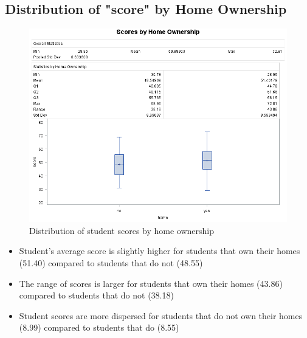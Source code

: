 \documentclass[12pt]{article}
\begin{document}
\subsection{Distribution of "score" by Home Ownership}
\begin{figure}[h]
    \centering
    \includegraphics[width=1.14\textwidth]{images/scores_by_home.png}
    \caption{Distribution of student scores by home ownership}
    \label{scores_by_home}
\end{figure}

\begin{itemize}
    \item Student's average score is slightly higher for students that own their homes (51.40) compared to students that do not (48.55)
    \item The range of scores is larger for students that own their homes (43.86) compared to students that do not (38.18)
    \item Student scores are more dispersed for students that do not own their homes (8.99) compared to students that do (8.55)
\end{itemize}
\newpage
\end{document}
